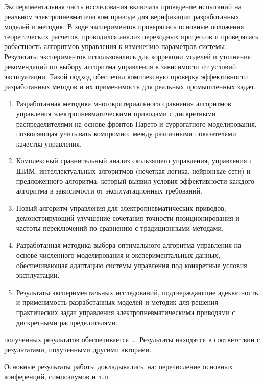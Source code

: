 Экспериментальная часть исследования включала проведение испытаний на реальном электропневматическом приводе для верификации
разработанных моделей и методик. В ходе экспериментов проверялись основные положения теоретических расчетов, проводился
анализ переходных процессов и проверялась робастность алгоритмов управления к изменению параметров системы. Результаты
экспериментов использовались для коррекции моделей и уточнения рекомендаций по
выбору алгоритма управления в зависимости от условий эксплуатации. Такой подход обеспечил комплексную проверку
эффективности разработанных методов и их применимость для реальных промышленных задач.

{}
\begin{enumerate}[beginpenalty=10000] %
    \item Разработанная методика многокритериального сравнения алгоритмов управления
    электропневматическими приводами с дискретными распределителями на основе фронтов Парето и
    суррогатного моделирования, позволяющая учитывать компромисс между различными показателями качества управления.
    \item Комплексный сравнительный анализ скользящего управления, управления с ШИМ, интеллектуальных
    алгоритмов (нечеткая логика, нейронные сети) и предложенного алгоритма, который выявил условия
    эффективности каждого алгоритма в зависимости от эксплуатационных требований.
    \item Новый алгоритм управления для электропневматических приводов, демонстрирующий улучшение сочетания
    точности позиционирования и частоты переключений по сравнению с традиционными методами.
    \item Разработанная методика выбора оптимального алгоритма управления на основе численного моделирования
    и экспериментальных данных, обеспечивающая адаптацию системы управления под конкретные условия эксплуатации.
    \item Результаты экспериментальных исследований, подтверждающие адекватность и применимость разработанных
    моделей и методик для решения практических задач управления электропневматическими приводами с дискретными распределителями.
\end{enumerate}

{\reliability} полученных результатов обеспечивается \ldots \ Результаты находятся в соответствии с результатами, полученными другими авторами.


{\probation}
Основные результаты работы докладывались~на:
перечисление основных конференций, симпозиумов и~т.\:п.

